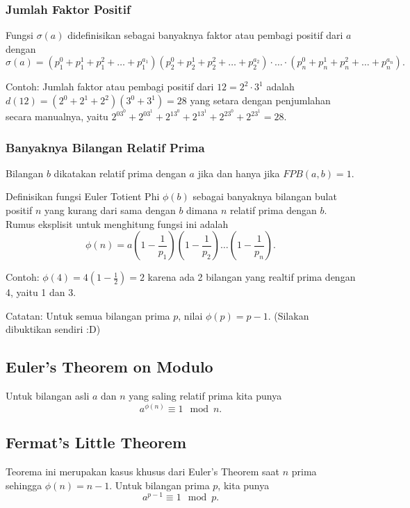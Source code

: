     \subsubsection{Jumlah Faktor Positif}
    Fungsi $\sigma (a)$ didefinisikan sebagai banyaknya faktor atau pembagi positif dari $a$ dengan
    $$\sigma (a) = (p_1^0+p_1^1+p_1^2+\dots+p_1^{a_1})(p_2^0+p_2^1+p_2^2+\dots+p_2^{a_2})\cdot \ldots \cdot (p_n^0+p_n^1+p_n^2+\dots+p_n^{a_n}).$$
    
    Contoh: Jumlah faktor atau pembagi positif dari $12= 2^2 \cdot 3^1$ adalah $d(12)=(2^0+2^1+2^2)(3^0+3^1)=28$ yang setara dengan penjumlahan secara manualnya, yaitu $2^03^0+2^03^1+2^13^0+2^13^1+2^23^0+2^23^1=28.$
    
    \subsubsection{Banyaknya Bilangan Relatif Prima}
    \begin{remark*}
    	     Bilangan $b$ dikatakan relatif prima dengan $a$ jika dan hanya jika $FPB(a,b)=1$.
    	\end{remark*}
     Definisikan fungsi Euler Totient Phi $\phi(b)$ sebagai banyaknya bilangan bulat positif $n$ yang kurang dari sama dengan $b$ dimana $n$ relatif prima dengan $b$. Rumus eksplisit untuk menghitung fungsi ini adalah
    $$\phi(n) = a\left(1-\dfrac{1}{p_1}\right)\left(1-\dfrac{1}{p_2}\right)\dots\left(1-\dfrac{1}{p_n}\right).$$
    
    Contoh: $\phi(4)=4(1-\frac{1}{2})=2$ karena ada 2 bilangan yang realtif prima dengan 4, yaitu 1 dan 3.
    
    Catatan: Untuk semua bilangan prima $p$, nilai $\phi(p) = p-1$. (Silakan dibuktikan sendiri :D)
    
    \subsection{Euler's Theorem on Modulo}
    Untuk bilangan asli $a$ dan $n$ yang saling relatif prima kita punya
    $$a^{\phi(n)} \equiv 1 \mod n.$$
    
    \subsection{Fermat's Little Theorem}
    Teorema ini merupakan kasus khusus dari Euler's Theorem saat $n$ prima sehingga $\phi(n)=n-1$. Untuk bilangan prima $p$, kita punya
    $$a^{p-1} \equiv 1 \mod p.$$
    
